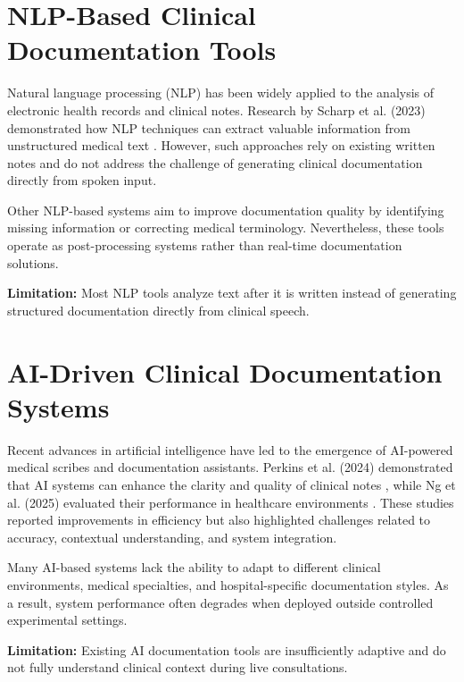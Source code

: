 \section{NLP-Based Clinical Documentation Tools}
\label{sec:lit:nlp}

Natural language processing (NLP) has been widely applied to the analysis of electronic health records and clinical notes. Research by Scharp et al. (2023) demonstrated how NLP techniques can extract valuable information from unstructured medical text \cite{scharp2023nlp}. However, such approaches rely on existing written notes and do not address the challenge of generating clinical documentation directly from spoken input.

Other NLP-based systems aim to improve documentation quality by identifying missing information or correcting medical terminology. Nevertheless, these tools operate as post-processing systems rather than real-time documentation solutions.

\textbf{Limitation:}  
Most NLP tools analyze text after it is written instead of generating structured documentation directly from clinical speech.

\section{AI-Driven Clinical Documentation Systems}
\label{sec:lit:ai}

Recent advances in artificial intelligence have led to the emergence of AI-powered medical scribes and documentation assistants. Perkins et al. (2024) demonstrated that AI systems can enhance the clarity and quality of clinical notes \cite{perkins2024ai}, while Ng et al. (2025) evaluated their performance in healthcare environments \cite{ng2025evaluation}. These studies reported improvements in efficiency but also highlighted challenges related to accuracy, contextual understanding, and system integration.

Many AI-based systems lack the ability to adapt to different clinical environments, medical specialties, and hospital-specific documentation styles. As a result, system performance often degrades when deployed outside controlled experimental settings.

\textbf{Limitation:}  
Existing AI documentation tools are insufficiently adaptive and do not fully understand clinical context during live consultations.

